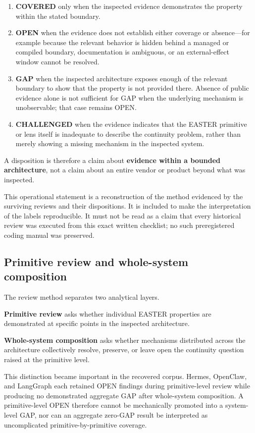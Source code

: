 \documentclass[11pt]{article}
\begin{document}
\begin{enumerate}
\item \textbf{COVERED} only when the inspected evidence demonstrates the property within the stated boundary.
\item \textbf{OPEN} when the evidence does not establish either coverage or absence---for example because the relevant behavior is hidden behind a managed or compiled boundary, documentation is ambiguous, or an external-effect window cannot be resolved.
\item \textbf{GAP} when the inspected architecture exposes enough of the relevant boundary to show that the property is not provided there. Absence of public evidence alone is not sufficient for GAP when the underlying mechanism is unobservable; that case remains OPEN.
\item \textbf{CHALLENGED} when the evidence indicates that the EASTER primitive or lens itself is inadequate to describe the continuity problem, rather than merely showing a missing mechanism in the inspected system.
\end{enumerate}

A disposition is therefore a claim about \textbf{evidence within a bounded architecture}, not a claim about an entire vendor or product beyond what was inspected.

This operational statement is a reconstruction of the method evidenced by the surviving reviews and their dispositions. It is included to make the interpretation of the labels reproducible. It must not be read as a claim that every historical review was executed from this exact written checklist; no such preregistered coding manual was preserved.

\subsection{Primitive review and whole-system composition}

The review method separates two analytical layers.

\textbf{Primitive review} asks whether individual EASTER properties are demonstrated at specific points in the inspected architecture.

\textbf{Whole-system composition} asks whether mechanisms distributed across the architecture collectively resolve, preserve, or leave open the continuity question raised at the primitive level.

This distinction became important in the recovered corpus. Hermes, OpenClaw, and LangGraph each retained OPEN findings during primitive-level review while producing no demonstrated aggregate GAP after whole-system composition. A primitive-level OPEN therefore cannot be mechanically promoted into a system-level GAP, nor can an aggregate zero-GAP result be interpreted as uncomplicated primitive-by-primitive coverage.
\end{document}
